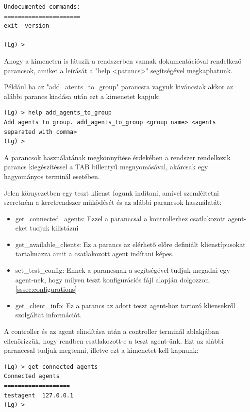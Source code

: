 \documentclass[a4paper,12pt,oneside]{report}
\begin{document}
\begin{enumerate}
\begin{lstlisting}
Undocumented commands:
======================
exit  version

(Lg) > 

\end{lstlisting}

Ahogy a kimeneten is látszik a rendszerben vannak dokumentációval rendelkező parancsok, amiket a leírását a "help <parancs>" segítségével megkaphatunk.

Például ha az "add\_atents\_to\_group" parancsra vagyuk kiváncsiak akkor az alábbi parancs kiadása után ezt a kimenetet kapjuk:

\begin{lstlisting}
(Lg) > help add_agents_to_group
Add agents to group. add_agents_to_group <group name> <agents separated with comma>
(Lg) > 
\end{lstlisting}

A parancsok használatának megkönnyítése érdekében a rendszer rendelkezik parancs kiegészítéssel a TAB billentyű megnyomásával, akárcsak egy hagyományos terminál esetében.

Jelen környezetben egy teszt klienst fogunk indítani, amivel szemléltetni szeretném a keretrendszer működését és az alábbi parancsok használatát:
\begin{itemize}
\itemsep0em
\item get\_connected\_agents: Ezzel a paranccsal a kontrollerhez csatlakozott agent-eket tudjuk kilistázni
\item get\_available\_clients: Ez a parancs az elérhető előre definiált klienstípusokat tartalmazza amit a csatlakozott agent indítani képes.
\item set\_test\_config: Ennek a parancsnak a segítségével tudjuk megadni egy agent-nek, hogy milyen teszt konfigurációs fájl alapján dolgozzon. \ref{sssec:configurations}
\item get\_client\_info: Ez a parancs az adott teszt agent-höz tartozó kliensekről szolgáltat információt.
\end{itemize}

A controller és az agent elindítása után a controller terminál ablakjában ellenőrizzük, hogy rendben csatlakozott-e a teszt agent-ünk.
Ezt az alábbi paranccsal tudjuk megtenni, illetve ezt a kimenetet kell kapnunk:
\begin{lstlisting}
(Lg) > get_connected_agents
Connected agents
===================
testagent  127.0.0.1
(Lg) > 

\end{lstlisting}


\end{enumerate}
\end{document}
